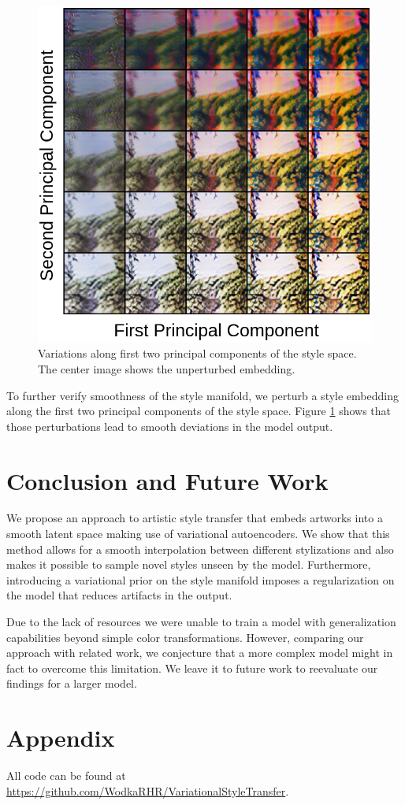 \documentclass[10pt,twocolumn,letterpaper]{article}
\begin{document}
\begin{figure}
\centering
\includegraphics[width=0.8\linewidth]{pca.png}
\caption{Variations along first two principal components of the style space. The center image shows the unperturbed embedding.}
\label{fig:pca}
\end{figure}

To further verify smoothness of the style manifold, we perturb a style embedding along the first two principal components of the style space. Figure \ref{fig:pca} shows that those perturbations lead to smooth deviations in the model output.

\section{Conclusion and Future Work}

We propose an approach to artistic style transfer that embeds artworks into a smooth latent space making use of variational autoencoders. We show that this method allows for a smooth interpolation between different stylizations and also makes it possible to sample novel styles unseen by the model. Furthermore, introducing a variational prior on the style manifold imposes a regularization on the model that reduces artifacts in the output. 

Due to the lack of resources we were unable to train a model with generalization capabilities beyond simple color transformations. However, comparing our approach with related work, we conjecture that a more complex model might in fact to overcome this limitation. We leave it to future work to reevaluate our findings for a larger model.

\section{Appendix}

All code can be found at \url{https://github.com/WodkaRHR/VariationalStyleTransfer}.


{\small


}
\end{document}
